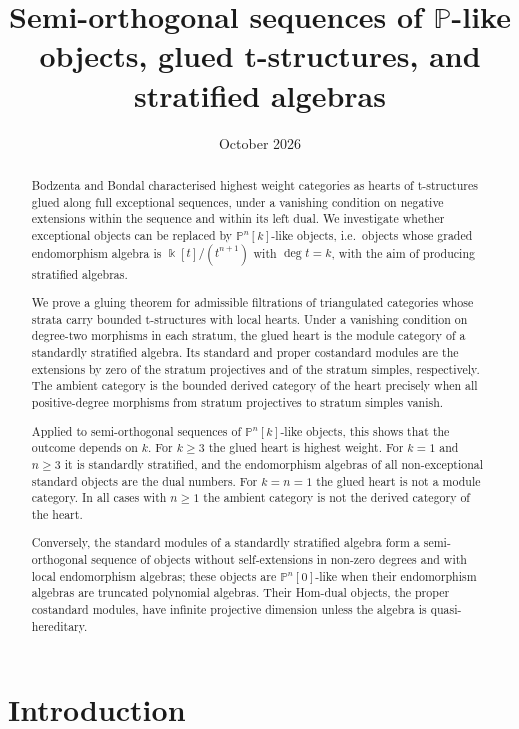 \documentclass[11pt,reqno]{amsart}
\title[$\mathbb{P}$-like strata, glued t-structures and stratified algebras]{Semi-orthogonal sequences of $\mathbb{P}$-like objects, glued t-structures, and stratified algebras}
\date{October 2026}
\theoremstyle{plain}
\theoremstyle{definition}
\theoremstyle{remark}
\newcommand{\kk}{\Bbbk}
\newcommand{\Pn}[2]{\mathbb{P}^{#1}[#2]}
\begin{document}
\begin{abstract}
Bodzenta and Bondal characterised highest weight categories as hearts of t-structures glued along full exceptional sequences, under a vanishing condition on negative extensions within the sequence and within its left dual. We investigate whether exceptional objects can be replaced by $\Pn{n}{k}$-like objects, i.e.\ objects whose graded endomorphism algebra is $\kk[t]/(t^{n+1})$ with $\deg t=k$, with the aim of producing stratified algebras.

We prove a gluing theorem for admissible filtrations of triangulated categories whose strata carry bounded t-structures with local hearts. Under a vanishing condition on degree-two morphisms in each stratum, the glued heart is the module category of a standardly stratified algebra. Its standard and proper costandard modules are the extensions by zero of the stratum projectives and of the stratum simples, respectively. The ambient category is the bounded derived category of the heart precisely when all positive-degree morphisms from stratum projectives to stratum simples vanish.

Applied to semi-orthogonal sequences of $\Pn{n}{k}$-like objects, this shows that the outcome depends on $k$. For $k\ge 3$ the glued heart is highest weight. For $k=1$ and $n\ge 3$ it is standardly stratified, and the endomorphism algebras of all non-exceptional standard objects are the dual numbers. For $k=n=1$ the glued heart is not a module category. In all cases with $n\geq 1$ the ambient category is not the derived category of the heart.

Conversely, the standard modules of a standardly stratified algebra form a semi-orthogonal sequence of objects without self-extensions in non-zero degrees and with local endomorphism algebras; these objects are $\Pn{n}{0}$-like when their endomorphism algebras are truncated polynomial algebras. Their Hom-dual objects, the proper costandard modules, have infinite projective dimension unless the algebra is quasi-hereditary.
\end{abstract}

\maketitle

\setcounter{tocdepth}{1}
\tableofcontents

\section{Introduction}
\end{document}
